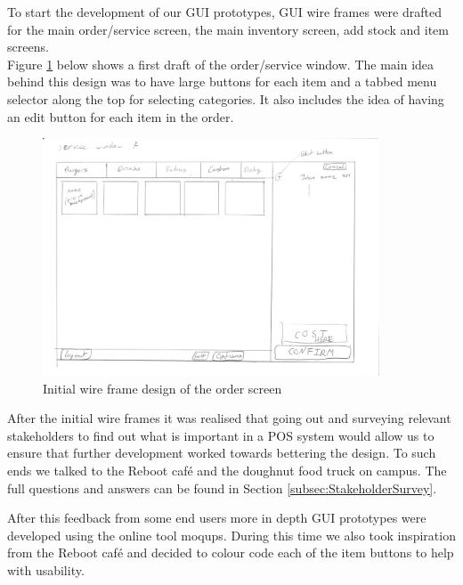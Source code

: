 
To start the development of our GUI prototypes,  GUI wire frames were drafted for the main order/service screen, the main inventory screen, add stock and item screens. \\

Figure \ref{fig:Service_window_A} below shows a first draft of the order/service window. The main idea behind this design was to have large buttons for each item and a tabbed menu selector along the top for selecting categories. It also includes the idea of having an edit button for each item in the order.

\begin{figure}[ht]
	\centering
	\includegraphics[width=100mm,angle=-90]{images/Wireframe_drafts/Service_window_A.jpg}
	\caption{Initial wire frame design of the order screen}
	\label{fig:Service_window_A}
\end{figure}

After the initial wire frames it was realised that going out and surveying relevant stakeholders to find out what is important in a POS system would allow us to ensure that further development worked towards bettering the design. To such ends we talked to the Reboot café and the doughnut food truck on campus. The full questions and answers can be found in Section \ref{subsec:StakeholderSurvey}.

After this feedback from some end users more in depth GUI prototypes were developed using the online tool moqups. During this time we also took inspiration from the Reboot café and decided to colour code each of the item buttons to help with usability.
\pagebreak

